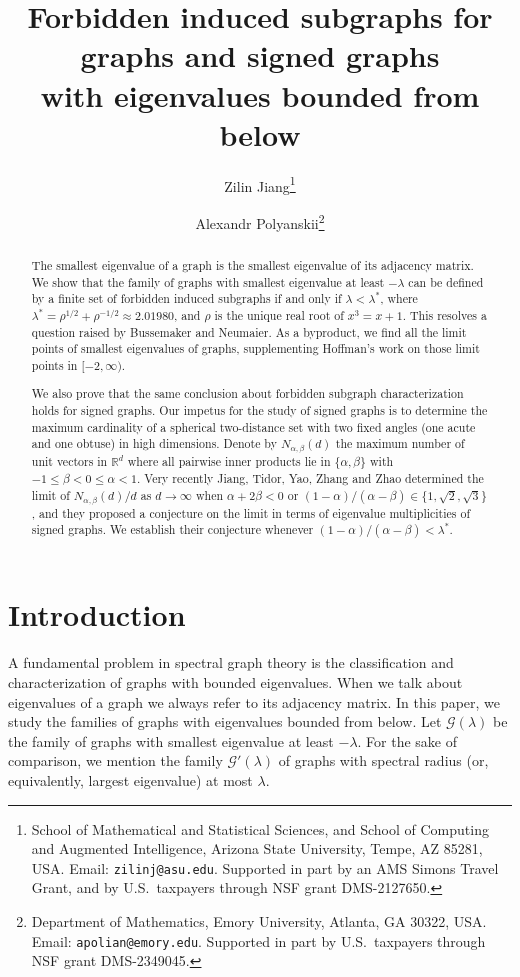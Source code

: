 \documentclass[11pt]{article}
\title{Forbidden induced subgraphs for graphs and signed graphs\\with eigenvalues bounded from below}
\author{
    Zilin Jiang\thanks{School of Mathematical and Statistical Sciences, and School of Computing and Augmented Intelligence, Arizona State University, Tempe, AZ 85281, USA. Email: {\tt zilinj@asu.edu}. Supported in part by an AMS Simons Travel Grant, and by U.S.\ taxpayers through NSF grant DMS-2127650.}
    \and Alexandr Polyanskii\thanks{Department of Mathematics, Emory University, Atlanta, GA 30322, USA. Email: {\tt apolian@emory.edu}. Supported in part by U.S.\ taxpayers through NSF grant DMS-2349045.}
}
\date{}
\theoremstyle{definition}
\theoremstyle{remark}
\newcommand{\la}{\lambda}
\newcommand{\G}{\mathcal{G}}
\newcommand{\Gp}{\G'(\la)}
\newcommand{\Gl}{\G(\la)}
\begin{document}
\maketitle

\begin{abstract}
	The smallest eigenvalue of a graph is the smallest eigenvalue of its adjacency matrix. We show that the family of graphs with smallest eigenvalue at least $-\lambda$ can be defined by a finite set of forbidden induced subgraphs if and only if $\lambda < \lambda^*$, where $\lambda^* = \rho^{1/2} + \rho^{-1/2} \approx 2.01980$, and $\rho$ is the unique real root of $x^3 = x + 1$. This resolves a question raised by Bussemaker and Neumaier. As a byproduct, we find all the limit points of smallest eigenvalues of graphs, supplementing Hoffman's work on those limit points in $[-2, \infty)$.
    
    We also prove that the same conclusion about forbidden subgraph characterization holds for signed graphs. Our impetus for the study of signed graphs is to determine the maximum cardinality of a spherical two-distance set with two fixed angles (one acute and one obtuse) in high dimensions. Denote by $N_{\alpha, \beta}(d)$ the maximum number of unit vectors in $\mathbb{R}^d$ where all pairwise inner products lie in $\{\alpha, \beta\}$ with $-1 \le \beta < 0 \le \alpha < 1$. Very recently Jiang, Tidor, Yao, Zhang and Zhao determined the limit of $N_{\alpha, \beta}(d)/d$ as $d\to\infty$ when $\alpha + 2\beta < 0$ or $(1-\alpha)/(\alpha-\beta) \in \{1,\sqrt2,\sqrt3\}$, and they proposed a conjecture on the limit in terms of eigenvalue multiplicities of signed graphs. We establish their conjecture whenever $(1-\alpha)/(\alpha - \beta) < \lambda^*$.
\end{abstract}

\section{Introduction} \label{sec:intro}

A fundamental problem in spectral graph theory is the classification and characterization of graphs with bounded eigenvalues. When we talk about eigenvalues of a graph we always refer to its adjacency matrix. In this paper, we study the families of graphs with eigenvalues bounded from below. Let $\Gl$ be the family of graphs with smallest eigenvalue at least $-\la$. For the sake of comparison, we mention the family $\Gp$ of graphs with spectral radius (or, equivalently, largest eigenvalue) at most $\la$.
\end{document}
